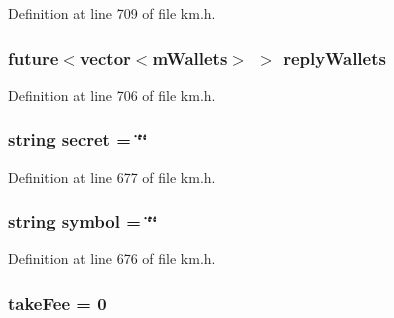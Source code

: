 Definition at line 709 of file km.\+h.

\subsubsection[{\texorpdfstring{reply\+Wallets}{replyWallets}}]{\setlength{\rightskip}{0pt plus 5cm}future$<$vector$<${\bf m\+Wallets}$>$ $>$ reply\+Wallets\hspace{0.3cm}{\ttfamily [protected]}}\hypertarget{class_k_1_1_gw_af1978cbd97d41a4197e481dc8fdfa5eb}{}\label{class_k_1_1_gw_af1978cbd97d41a4197e481dc8fdfa5eb}


Definition at line 706 of file km.\+h.

\subsubsection[{\texorpdfstring{secret}{secret}}]{\setlength{\rightskip}{0pt plus 5cm}string secret = \char`\"{}\char`\"{}}\hypertarget{class_k_1_1_gw_ae27f9f88345b7cc8388e912993d34b69}{}\label{class_k_1_1_gw_ae27f9f88345b7cc8388e912993d34b69}


Definition at line 677 of file km.\+h.

\subsubsection[{\texorpdfstring{symbol}{symbol}}]{\setlength{\rightskip}{0pt plus 5cm}string symbol = \char`\"{}\char`\"{}}\hypertarget{class_k_1_1_gw_aa0183fad0a4c5c8a30c8fdc7b81a1279}{}\label{class_k_1_1_gw_aa0183fad0a4c5c8a30c8fdc7b81a1279}


Definition at line 676 of file km.\+h.

\subsubsection[{\texorpdfstring{take\+Fee}{takeFee}}]{ take\+Fee = 0}\hypertarget{class_k_1_1_gw_a1a5ea3c2a5f11d2100866df8ae3b32fe}{}\label{class_k_1_1_gw_a1a5ea3c2a5f11d2100866df8ae3b32fe}


